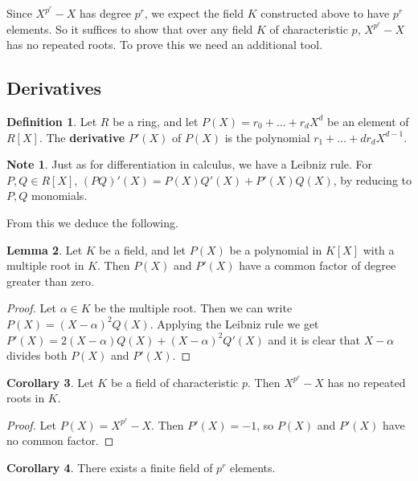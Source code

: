 \documentclass{article}
\newcommand{\rb}[1]{\left( #1 \right)}
\renewcommand{\sb}[1]{\left[ #1 \right]}
\theoremstyle{definition}\newtheorem{definition}{Definition}[subsection]
\theoremstyle{definition}\newtheorem{remark}[definition]{Remark}
\theoremstyle{definition}\newtheorem*{example}{Example}
\theoremstyle{definition}\newtheorem*{note}{Note}
\newtheorem{lemma}[definition]{Lemma}
\newtheorem{corollary}[definition]{Corollary}
\begin{document}
Since $ X^{p^r} - X $ has degree $ p^r $, we expect the field $ K $ constructed above to have $ p^r $ elements. So it suffices to show that over any field $ K $ of characteristic $ p $, $ X^{p^r} - X $ has no repeated roots. To prove this we need an additional tool.

\subsection{Derivatives}

\begin{definition}
Let $ R $ be a ring, and let $ P\rb{X} = r_0 + \dots + r_dX^d $ be an element of $ R\sb{X} $. The \textbf{derivative} $ P'\rb{X} $ of $ P\rb{X} $ is the polynomial $ r_1 + \dots + dr_dX^{d - 1} $.
\end{definition}

\begin{note}
Just as for differentiation in calculus, we have a Leibniz rule. For $ P, Q \in R\sb{X} $, $ \rb{PQ}'\rb{X} = P\rb{X}Q'\rb{X} + P'\rb{X}Q\rb{X} $, by reducing to $ P, Q $ monomials.
\end{note}

From this we deduce the following.

\begin{lemma}
Let $ K $ be a field, and let $ P\rb{X} $ be a polynomial in $ K\sb{X} $ with a multiple root in $ K $. Then $ P\rb{X} $ and $ P'\rb{X} $ have a common factor of degree greater than zero.
\end{lemma}

\begin{proof}
Let $ \alpha \in K $ be the multiple root. Then we can write $ P\rb{X} = \rb{X - \alpha}^2Q\rb{X} $. Applying the Leibniz rule we get $ P'\rb{X} = 2\rb{X - \alpha}Q\rb{X} + \rb{X - \alpha}^2Q'\rb{X} $ and it is clear that $ X - \alpha $ divides both $ P\rb{X} $ and $ P'\rb{X} $.
\end{proof}

\begin{corollary}
Let $ K $ be a field of characteristic $ p $. Then $ X^{p^r} - X $ has no repeated roots in $ K $.
\end{corollary}

\begin{proof}
Let $ P\rb{X} = X^{p^r} - X $. Then $ P'\rb{X} = -1 $, so $ P\rb{X} $ and $ P'\rb{X} $ have no common factor.
\end{proof}

\begin{corollary}
There exists a finite field of $ p^r $ elements.
\end{corollary}
\end{document}
